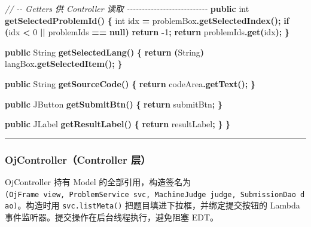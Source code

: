 \documentclass[
  11pt,
]{ctexart}
\newenvironment{Shaded}{\begin{snugshade}}{\end{snugshade}}
\newcommand{\BuiltInTok}[1]{#1}
\newcommand{\CommentTok}[1]{\textcolor[rgb]{0.56,0.35,0.01}{\textit{#1}}}
\newcommand{\ControlFlowTok}[1]{\textcolor[rgb]{0.13,0.29,0.53}{\textbf{#1}}}
\newcommand{\DataTypeTok}[1]{\textcolor[rgb]{0.13,0.29,0.53}{#1}}
\newcommand{\DecValTok}[1]{\textcolor[rgb]{0.00,0.00,0.81}{#1}}
\newcommand{\FunctionTok}[1]{\textcolor[rgb]{0.13,0.29,0.53}{\textbf{#1}}}
\newcommand{\KeywordTok}[1]{\textcolor[rgb]{0.13,0.29,0.53}{\textbf{#1}}}
\newcommand{\NormalTok}[1]{#1}
\newcommand{\OperatorTok}[1]{\textcolor[rgb]{0.81,0.36,0.00}{\textbf{#1}}}
\begin{document}
\begin{Shaded}
\begin{Highlighting}[]
    \CommentTok{// {-}{-} Getters 供 Controller 读取 {-}{-}{-}{-}{-}{-}{-}{-}{-}{-}{-}{-}{-}{-}{-}{-}{-}{-}{-}{-}{-}{-}{-}{-}{-}{-}{-}}
    \KeywordTok{public} \DataTypeTok{int} \FunctionTok{getSelectedProblemId}\OperatorTok{()} \OperatorTok{\{}
        \DataTypeTok{int}\NormalTok{ idx }\OperatorTok{=}\NormalTok{ problemBox}\OperatorTok{.}\FunctionTok{getSelectedIndex}\OperatorTok{();}
        \ControlFlowTok{if} \OperatorTok{(}\NormalTok{idx }\OperatorTok{\textless{}} \DecValTok{0} \OperatorTok{||}\NormalTok{ problemIds }\OperatorTok{==} \KeywordTok{null}\OperatorTok{)} \ControlFlowTok{return} \OperatorTok{{-}}\DecValTok{1}\OperatorTok{;}
        \ControlFlowTok{return}\NormalTok{ problemIds}\OperatorTok{.}\FunctionTok{get}\OperatorTok{(}\NormalTok{idx}\OperatorTok{);}
    \OperatorTok{\}}

    \KeywordTok{public} \BuiltInTok{String} \FunctionTok{getSelectedLang}\OperatorTok{()} \OperatorTok{\{}
        \ControlFlowTok{return} \OperatorTok{(}\BuiltInTok{String}\OperatorTok{)}\NormalTok{ langBox}\OperatorTok{.}\FunctionTok{getSelectedItem}\OperatorTok{();}
    \OperatorTok{\}}

    \KeywordTok{public} \BuiltInTok{String} \FunctionTok{getSourceCode}\OperatorTok{()} \OperatorTok{\{}
        \ControlFlowTok{return}\NormalTok{ codeArea}\OperatorTok{.}\FunctionTok{getText}\OperatorTok{();}
    \OperatorTok{\}}

    \KeywordTok{public} \BuiltInTok{JButton} \FunctionTok{getSubmitBtn}\OperatorTok{()} \OperatorTok{\{}
        \ControlFlowTok{return}\NormalTok{ submitBtn}\OperatorTok{;}
    \OperatorTok{\}}

    \KeywordTok{public} \BuiltInTok{JLabel} \FunctionTok{getResultLabel}\OperatorTok{()} \OperatorTok{\{}
        \ControlFlowTok{return}\NormalTok{ resultLabel}\OperatorTok{;}
    \OperatorTok{\}}
\OperatorTok{\}}
\end{Highlighting}
\end{Shaded}

\begin{center}\rule{0.5\linewidth}{0.5pt}\end{center}

\hypertarget{ojcontrollercontroller-ux5c42}{%
\subsubsection{OjController（Controller
层）}\label{ojcontrollercontroller-ux5c42}}

OjController 持有 Model 的全部引用，构造签名为
\texttt{(OjFrame\ view,\ ProblemService\ svc,\ MachineJudge\ judge,\ SubmissionDao\ dao)}。构造时用
\texttt{svc.listMeta()} 把题目填进下拉框，并绑定提交按钮的 Lambda
事件监听器。提交操作在后台线程执行，避免阻塞 EDT。
\end{document}
